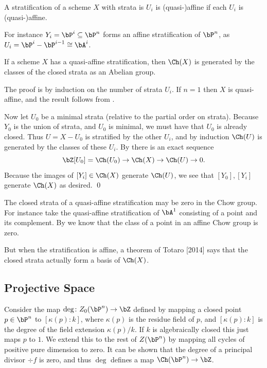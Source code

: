 \bdefn

    A stratification of a scheme $X$ with strata is $U_i$ is {\emphcolor (quasi-)affine} if each $U_i$ is (quasi-)affine.

\edefn

For instance $Y_i=\bP^i\subseteq\bP^n$ forms an affine stratification of $\bP^n$, as $U_i=\bP^i-\bP^{i-1}\cong\bA^i$.

\bprop[name={stratagenerate}]

    If a scheme $X$ has a quasi-affine stratification, then $\Ch(X)$ is generated by the classes of the closed strata
    as an Abelian group.

\eprop

\bproof

    The proof is by induction on the number of strata $U_i$.
    If $n=1$ then $X$ is quasi-affine, and the result follows from .

    Now let $U_0$ be a minimal strata (relative to the partial order on strata).
    Because $Y_0$ is the union of strata, and $U_0$ is minimal, we must have that $U_0$ is already closed.
    Thus $U=X-U_0$ is stratified by the other $U_i$, and by induction $\Ch(U)$ is generated by the classes of these $U_i$.
    By  there is an exact sequence
    $$ \bZ[U_0] = \Ch(U_0) \to \Ch(X) \to \Ch(U) \to 0 . $$
    Because the images of $[Y_i]\in\Ch(X)$ generate $\Ch(U)$, we see that $[Y_0],[Y_i]$ generate $\Ch(X)$ as desired.
    \qed

\eproof

\bnote

    The closed strata of a quasi-affine stratification may be zero in the Chow group.
    For instance take the quasi-affine stratification of $\bA^1$ consisting of a point and its complement.
    By  we know that the class of a point in an affine Chow group is zero.

    But when the stratification is affine, a theorem of Totaro [2014] says that the closed strata actually form a basis
    of $\Ch(X)$.

\enote

\subsection{Projective Space}

Consider the map $\deg\colon Z_0(\bP^n)\to\bZ$ defined by mapping a closed point $p\in\bP^n$ to $[\kappa(p):k]$, where $\kappa(p)$ is the residue field
of $p$, and $[\kappa(p):k]$ is the degree of the field extension $\kappa(p)/k$.
If $k$ is algebraically closed this just maps $p$ to $1$.
We extend this to the rest of $Z(\bP^n)$ by mapping all cycles of positive pure dimension to zero.
It can be shown that the degree of a principal divisor $\div f$ is zero, and thus $\deg$ defines a map $\Ch(\bP^n)\to\bZ$.

